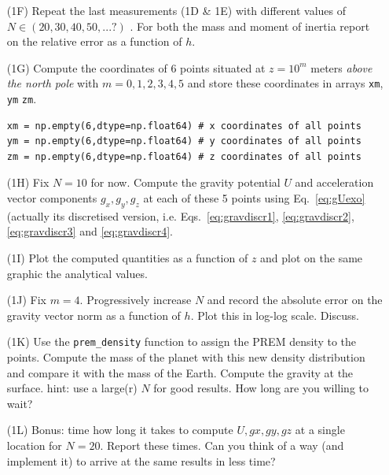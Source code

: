 \begin{itemize}

\item[(1F)] Repeat the last measurements (1D \& 1E) with different values of $N\in(20,30,40,50,...?)$ .
For both the mass and moment of inertia report on the relative error as a function of $h$.

\item[(1G)] Compute the coordinates of 6 points situated at $z=10^m$ meters 
{\it above the north pole} with $m=0,1,2,3,4,5$ and 
store these coordinates in arrays {\tt xm}, {\tt ym} {\tt zm}. 
\begin{lstlisting}
xm = np.empty(6,dtype=np.float64) # x coordinates of all points
ym = np.empty(6,dtype=np.float64) # y coordinates of all points
zm = np.empty(6,dtype=np.float64) # z coordinates of all points
\end{lstlisting}

\item[(1H)] Fix $N=10$ for now. Compute the gravity potential $U$ and acceleration vector 
components $g_x,g_y,g_z$ at each of these 5 points using Eq.~\eqref{eq:gUexo} (actually its 
discretised version, i.e. Eqs.~\eqref{eq:gravdiscr1}, \eqref{eq:gravdiscr2}, 
\eqref{eq:gravdiscr3} and \eqref{eq:gravdiscr4}.
 
\item[(1I)] Plot the computed quantities as a function of $z$ and plot on 
the same graphic the analytical values. 

\item[(1J)] Fix $m=4$. Progressively increase $N$ and record the absolute error on the gravity vector norm 
as a function of $h$. Plot this in log-log scale. Discuss.

\item[(1K)] Use the {\tt prem\_density} function to assign the PREM \cite{dzan81} density to the points. 
Compute the mass of the planet with this 
new density distribution and compare it with the mass of the Earth. Compute the gravity at the surface.
hint: use a large(r) $N$ for good results. How long are you willing to wait? 

\item[(1L)] Bonus: time how long it takes to compute $U,gx,gy,gz$ at a single location for $N=20$. Report these times. 
Can you think of a way (and implement it) to arrive at the same results in less time?  

\end{itemize}

